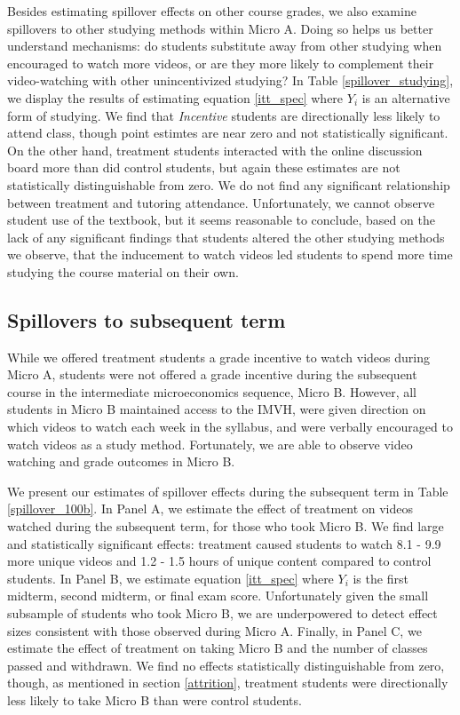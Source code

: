 \documentclass[12pt]{article}
\begin{document}
Besides estimating spillover effects on other course grades, we also examine spillovers to other studying methods within Micro A. Doing so helps us better understand mechanisms: do students substitute away from other studying when encouraged to watch more videos, or are they more likely to complement their video-watching with other unincentivized studying? In Table \ref{spillover_studying}, we display the results of estimating equation \ref{itt_spec} where $Y_i$ is an alternative form of studying. We find that \textit{Incentive} students are directionally less likely to attend class, though point estimtes are near zero and not statistically significant. On the other hand, treatment students interacted with the online discussion board more than did control students, but again these estimates are not statistically distinguishable from zero. We do not find any significant relationship between treatment and tutoring attendance.  Unfortunately, we cannot observe student use of the textbook, but it seems reasonable to conclude, based on the lack of any significant findings that students altered the other studying methods we observe, that the inducement to watch videos led students to spend more time studying the course material on their own.  

\subsection{Spillovers to subsequent term}

While we offered treatment students a grade incentive to watch videos during Micro A, students were not offered a grade incentive during the subsequent course in the intermediate microeconomics sequence, Micro B. However, all students in Micro B maintained access to the IMVH, were given direction on which videos to watch each week in the syllabus, and were verbally encouraged to watch videos as a study method. Fortunately, we are able to observe video watching and grade outcomes in Micro B.

We present our estimates of spillover effects during the subsequent term in Table \ref{spillover_100b}. In Panel A, we estimate the effect of treatment on videos watched during the subsequent term, for those who took Micro B. We find large and statistically significant effects: treatment caused students to watch 8.1 - 9.9 more unique videos and 1.2 - 1.5 hours of unique content compared to control students. In Panel B, we estimate equation \ref{itt_spec} where $Y_i$ is the first midterm, second midterm, or final exam score. Unfortunately given the small subsample of students who took Micro B, we are underpowered to detect effect sizes consistent with those observed during Micro A. Finally, in Panel C, we estimate the effect of treatment on taking Micro B and the number of classes passed and withdrawn. We find no effects statistically distinguishable from zero, though, as mentioned in section \ref{attrition}, treatment students were directionally less likely to take Micro B than were control students.
\end{document}
